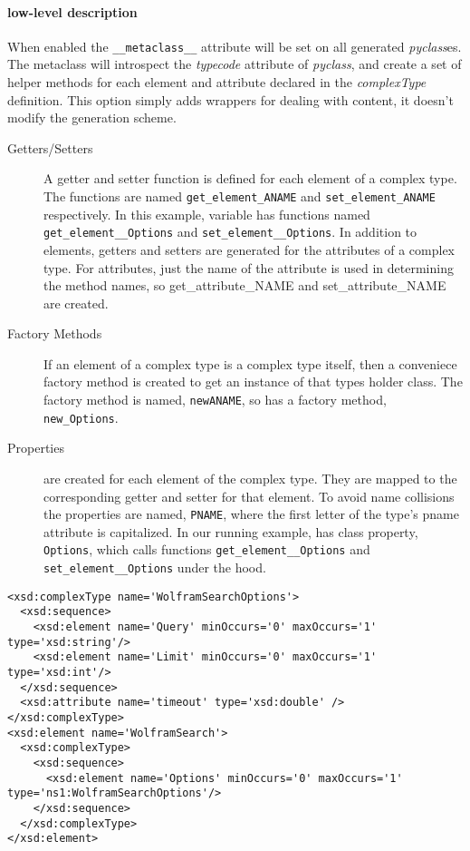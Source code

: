 \paragraph{low-level description}
When enabled the \verb!__metaclass__! attribute will be set on all generated 
{\it pyclass}es.  The metaclass will introspect the {\it typecode} attribute of 
{\it pyclass}, and create a set of helper methods for each element
and attribute declared in the {\it complexType} definition.  This option simply
adds wrappers for dealing with content, it doesn't modify the generation scheme.

\begin{description}
\item[Getters/Setters] A getter and setter function is defined for each element
of a complex type.  The functions are named \verb!get_element_ANAME! and
\verb!set_element_ANAME! respectively.  In this example, variable 
has functions named \verb!get_element__Options! and \verb!set_element__Options!.
 In addition to elements, getters and setters are generated for the attributes
 of a complex type.  For attributes, just the name of the attribute is used in
 determining the method names, so get_attribute_NAME and set_attribute_NAME are
 created.

\item[Factory Methods] If an element of a complex type is a complex type itself,
then a conveniece factory method is created to get an instance of that types
holder class.  The factory method is named, \verb!newANAME!, so  has
a factory method, \verb!new_Options!.

\item[Properties]
are created for each element of the complex type.  They are mapped to the
corresponding getter and setter for that element.  To avoid name collisions the
properties are named, \verb!PNAME!, where the first letter of the type's pname
attribute is capitalized.  In our running example,  has class
property, \verb!Options!, which calls functions \verb!get_element__Options! and
\verb!set_element__Options! under the hood.

\end{description}

\begin{verbatim}
<xsd:complexType name='WolframSearchOptions'>
  <xsd:sequence>
    <xsd:element name='Query' minOccurs='0' maxOccurs='1' type='xsd:string'/>
    <xsd:element name='Limit' minOccurs='0' maxOccurs='1' type='xsd:int'/>
  </xsd:sequence>
  <xsd:attribute name='timeout' type='xsd:double' />
</xsd:complexType>
<xsd:element name='WolframSearch'>
  <xsd:complexType>
    <xsd:sequence>
      <xsd:element name='Options' minOccurs='0' maxOccurs='1' type='ns1:WolframSearchOptions'/>
    </xsd:sequence>
  </xsd:complexType>
</xsd:element>
\end{verbatim}

